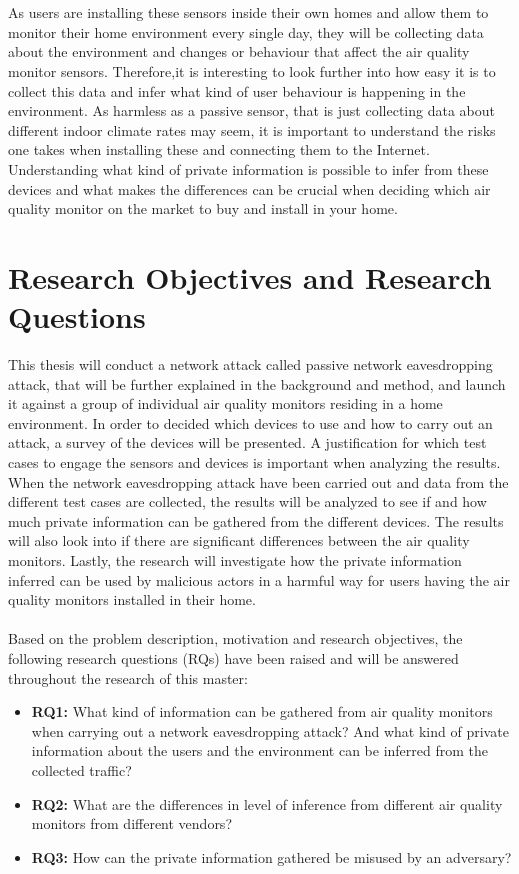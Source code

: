 \\\\
As users are installing these sensors inside their own homes and allow them to monitor their home environment every single day, they will be collecting data about the environment and changes or behaviour that affect the air quality monitor sensors. Therefore,it is interesting to look further into how easy it is to collect this data and infer what kind of user behaviour is happening in the environment. As harmless as a passive sensor, that is just collecting data about different indoor climate rates may seem, it is important to understand the risks one takes when installing these and connecting them to the Internet. Understanding what kind of private information is possible to infer from these devices and what makes the differences can be crucial when deciding which air quality monitor on the market to buy and install in your home.

\section{Research Objectives and Research Questions}
This thesis will conduct a network attack called passive network eavesdropping attack, that will be further explained in the background and method, and launch it against a group of individual air quality monitors residing in a home environment. In order to decided which devices to use and how to carry out an attack, a survey of the devices will be presented. A justification for which test cases to engage the sensors and devices is important when analyzing the results. When the network eavesdropping attack have been carried out and data  from the different test cases are collected, the results will be analyzed to see if and how much private information can be gathered from the different devices. The results will also look into if there are significant differences between the air quality monitors. Lastly, the research will investigate how the private information inferred can be used by malicious actors in a harmful way for users having the air quality monitors installed in their home.
\\\\
Based on the problem description, motivation and research objectives, the following research questions (RQs) have been raised and will be answered throughout the research of this master:
\begin{itemize}
    \item 
    \textbf{RQ1:} What kind of information can be gathered from air quality monitors when carrying out a network eavesdropping attack? And what kind of private information about the users and the environment can be inferred from the collected traffic?\\
    \item 
    \textbf{RQ2:} What are the differences in level of inference from different air quality monitors from different vendors?\\
    \item 
    \textbf{RQ3:} How can the private information gathered be misused by an adversary?\\
\end{itemize}

